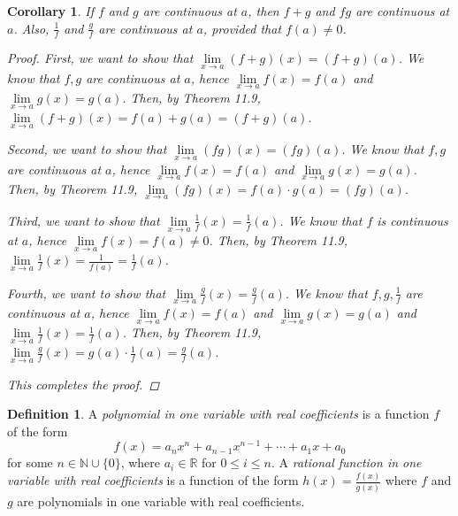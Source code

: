 \documentclass[11pt]{article}
\newcommand{\bbN}{\mathbb{N}}
\newcommand{\bbR}{\mathbb{R}}
\renewcommand{\_}[1]{\underline{ #1 }}
\newtheorem{corollary}[theorem]{Corollary}
\theoremstyle{definition}
\newtheorem{definition}[theorem]{Definition}
\numberwithin{equation}{subsection}
\begin{document}
\begin{corollary}
	If $f$ and $g$ are continuous at $a$, then $f + g$ and $fg$ are continuous at $a$. Also, $\frac{1}{f}$ and $\frac{g}{f}$ are continuous at $a$, provided that $f(a) \neq 0$.
        
\begin{proof}
First, we want to show that $\lim\limits_{x \to a} (f+g)(x) = (f+g)(a)$. We know that $f,g$ are continuous at $a$, hence $\lim\limits_{x \to a} f(x) = f(a)$ and $\lim\limits_{x \to a} g(x) = g(a)$. Then, by Theorem 11.9, $\lim\limits_{x \to a} (f+g)(x) = f(a)+g(a)=(f+g)(a)$. 

Second, we want to show that $\lim\limits_{x \to a} (fg)(x) = (fg)(a)$. We know that $f,g$ are continuous at $a$, hence $\lim\limits_{x \to a} f(x) = f(a)$ and $\lim\limits_{x \to a} g(x) = g(a)$. Then, by Theorem 11.9, $\lim\limits_{x \to a} (fg)(x) = f(a)\cdot g(a)=(fg)(a)$. 

Third, we want to show that $\lim\limits_{x \to a} \frac{1}{f}(x) = \frac{1}{f}(a)$. We know that $f$ is continuous at $a$, hence $\lim\limits_{x \to a} f(x) = f(a) \neq 0$. Then, by Theorem 11.9, $\lim\limits_{x \to a} \frac{1}{f}(x) = \frac{1}{f(a)}=\frac{1}{f}(a)$. 

Fourth, we want to show that $\lim\limits_{x \to a} \frac{g}{f}(x) = \frac{g}{f}(a)$. We know that $f,g, \frac{1}{f}$ are continuous at $a$, hence $\lim\limits_{x \to a} f(x) = f(a)$ and $\lim\limits_{x \to a} g(x) = g(a)$ and $\lim\limits_{x \to a} \frac{1}{f}(x) =\frac{1}{f}(a)$. Then, by Theorem 11.9, $\lim\limits_{x \to a} \frac{g}{f}(x) = g(a)\cdot \frac{1}{f}(a)=\frac{g}{f}(a)$. 

This completes the proof.


\renewcommand\qedsymbol{QED}
\end{proof}


\end{corollary}

\begin{definition}
	A \emph{polynomial in one variable with real coefficients} is a function $f$ of the form 
	\[
		f(x) = a_n x^n+a_{n-1}x^{n-1}+\cdots+a_1 x+a_0
	\]
	for some $n \in \bbN \cup \{0\}$, where $a_i \in \bbR$ for $0\leq i\leq n$. A \emph{rational function in one variable with real coefficients} is a function of the form $h(x) = \frac{f(x)}{g(x)}$ where $f$ and $g$ are polynomials in one variable with real coefficients.
\end{definition}
\end{document}
